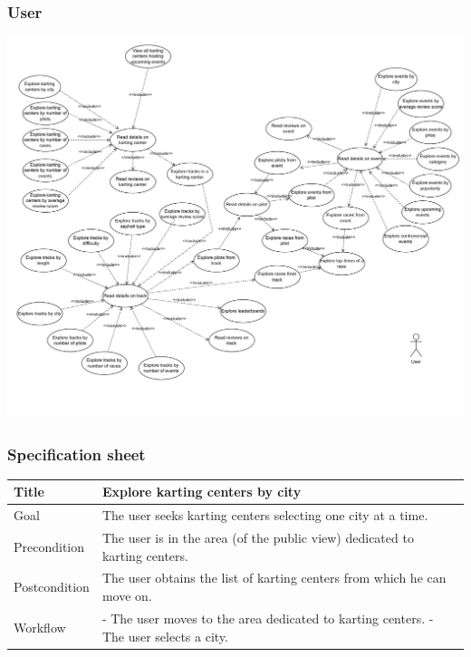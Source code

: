 \documentclass{beamer}
\begin{document}
\begin{frame}
    \frametitle{User}
    \centering
    \includegraphics[width=0.8\linewidth]{drawio/user.pdf}
\end{frame}


\begin{frame}
\frametitle{Specification sheet}
\begin{table}
    \tiny
    \begin{tabular}{|p{2cm}|p{6cm}|}
    \hline
    Title & \textbf{Explore karting centers by city} \\
    \hline
    Goal & The user seeks karting centers selecting one city at a time. \\
    \hline
    Precondition & The user is in the area (of the public view) dedicated to karting centers.\\
    \hline
    Postcondition & The user obtains the list of karting centers from which he can move on.\\
    \hline
    Workflow &
    - The user moves to the area dedicated to karting centers. \newline
    - The user selects a city. \\
    \hline
    \end{tabular}
\end{table}
\end{frame}
\end{document}
